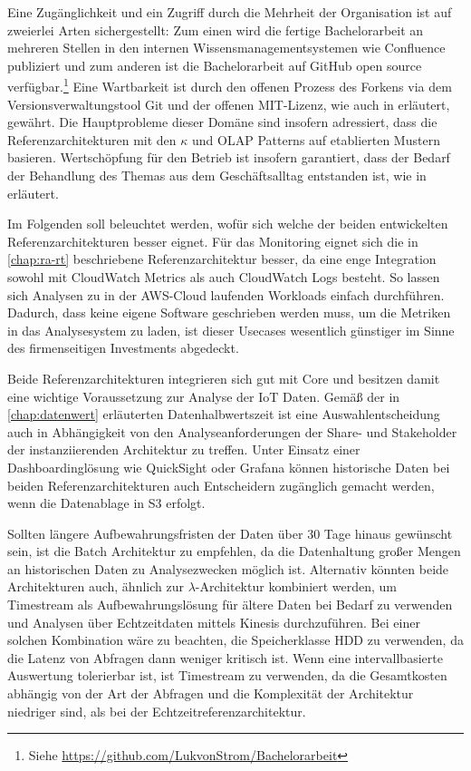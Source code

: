 Eine Zugänglichkeit und ein Zugriff durch die Mehrheit der Organisation ist auf zweierlei Arten sichergestellt: Zum einen wird die fertige Bachelorarbeit an mehreren Stellen in den internen Wissensmanagementsystemen wie Confluence publiziert und zum anderen ist die Bachelorarbeit auf GitHub open source verfügbar.\footnote{Siehe \url{https://github.com/LukvonStrom/Bachelorarbeit}} Eine Wartbarkeit ist durch den offenen Prozess des Forkens via dem Versionsverwaltungstool Git und der offenen MIT-Lizenz, wie auch in  erläutert, gewährt. Die Hauptprobleme dieser Domäne sind insofern adressiert, dass die Referenzarchitekturen mit den $\kappa$ und \ac{OLAP} Patterns auf etablierten Mustern basieren. Wertschöpfung für den Betrieb ist insofern garantiert, dass der Bedarf der Behandlung des Themas aus dem Geschäftsalltag entstanden ist, wie in  erläutert.


Im Folgenden soll beleuchtet werden, wofür sich welche der beiden entwickelten Referenzarchitekturen besser eignet.
Für das Monitoring eignet sich die in \autoref{chap:ra-rt} beschriebene Referenzarchitektur besser, da eine enge Integration sowohl mit CloudWatch Metrics als auch CloudWatch Logs besteht. So lassen sich Analysen zu in der \ac{AWS}-Cloud laufenden Workloads einfach durchführen. Dadurch, dass keine eigene Software geschrieben werden muss, um die Metriken in das Analysesystem zu laden, ist dieser Usecases wesentlich günstiger im Sinne des firmenseitigen Investments abgedeckt.

Beide Referenzarchitekturen integrieren sich gut mit \AWSIOT{} Core und besitzen damit eine wichtige Voraussetzung zur Analyse der \ac{IoT} Daten. Gemäß der in \autoref{chap:datenwert} erläuterten Datenhalbwertszeit ist eine Auswahlentscheidung auch in Abhängigkeit von den Analyseanforderungen der Share- und Stakeholder der instanziierenden Architektur zu treffen. Unter Einsatz einer Dashboardinglösung wie QuickSight oder Grafana können historische Daten bei beiden Referenzarchitekturen auch Entscheidern zugänglich gemacht werden, wenn die Datenablage in \ac{S3} erfolgt. 

Sollten längere Aufbewahrungsfristen der Daten über 30 Tage hinaus gewünscht sein, ist die Batch Architektur zu empfehlen, da die Datenhaltung großer Mengen an historischen Daten zu Analysezwecken möglich ist. Alternativ könnten beide Architekturen auch, ähnlich zur $\lambda$-Architektur kombiniert werden, um Timestream als Aufbewahrungslösung für ältere Daten bei Bedarf zu verwenden und Analysen über Echtzeitdaten mittels Kinesis durchzuführen. Bei einer solchen Kombination wäre zu beachten, die Speicherklasse \ac{HDD} zu verwenden, da die Latenz von Abfragen dann weniger kritisch ist. Wenn eine intervallbasierte Auswertung tolerierbar ist, ist Timestream zu verwenden, da die Gesamtkosten abhängig von der Art der Abfragen und die Komplexität der Architektur niedriger sind, als bei der Echtzeitreferenzarchitektur.


